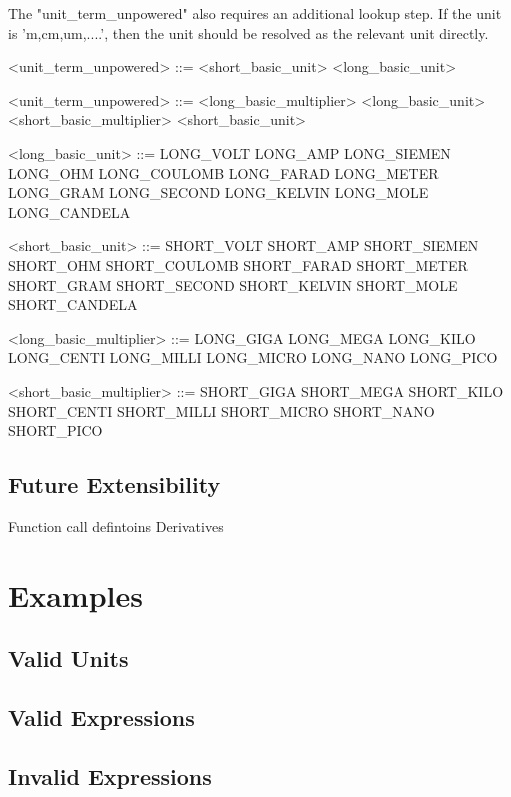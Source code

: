 \documentclass{article}
\begin{document}
The "unit\_term\_unpowered" also requires an additional lookup step. If the 
unit is 'm,cm,um,....', then the unit should be resolved as the relevant unit directly.

{\scriptsize
\begin{grammar}
<unit\_term\_unpowered> ::=  <short\_basic\_unit> 
\alt <long\_basic\_unit>

<unit\_term\_unpowered> ::=  <long\_basic\_multiplier> <long\_basic\_unit>
\alt <short\_basic\_multiplier> <short\_basic\_unit> 

<long\_basic\_unit> ::=  LONG\_VOLT 
\alt LONG\_AMP 
\alt LONG\_SIEMEN
\alt LONG\_OHM
\alt LONG\_COULOMB
\alt LONG\_FARAD
\alt LONG\_METER
\alt LONG\_GRAM
\alt LONG\_SECOND
\alt LONG\_KELVIN
\alt LONG\_MOLE
\alt LONG\_CANDELA

<short\_basic\_unit> ::= SHORT\_VOLT 
\alt SHORT\_AMP 
\alt SHORT\_SIEMEN
\alt SHORT\_OHM
\alt SHORT\_COULOMB
\alt SHORT\_FARAD
\alt SHORT\_METER
\alt SHORT\_GRAM
\alt SHORT\_SECOND
\alt SHORT\_KELVIN
\alt SHORT\_MOLE
\alt SHORT\_CANDELA

<long\_basic\_multiplier> ::=  LONG\_GIGA 
\alt LONG\_MEGA 
\alt LONG\_KILO
\alt LONG\_CENTI
\alt LONG\_MILLI
\alt LONG\_MICRO
\alt LONG\_NANO
\alt LONG\_PICO

<short\_basic\_multiplier> ::=   SHORT\_GIGA 
\alt SHORT\_MEGA                           
\alt SHORT\_KILO                           
\alt SHORT\_CENTI                          
\alt SHORT\_MILLI                          
\alt SHORT\_MICRO                          
\alt SHORT\_NANO                           
\alt SHORT\_PICO                           
                              
\end{grammar}
}


\subsection{Future Extensibility}
Function call defintoins
Derivatives









\newpage
\section{Examples}
\subsection{Valid Units}


\subsection{Valid Expressions}



\subsection{Invalid Expressions}
\end{document}
